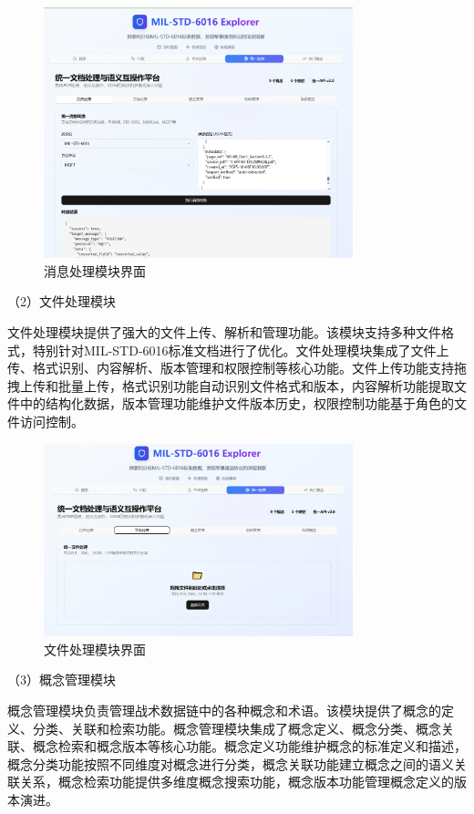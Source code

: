 \begin{figure}[H]
\centering
\includegraphics[width=0.8\textwidth]{chapters/fig-0/front_trans.png}
\caption{消息处理模块界面}
\label{fig:frontend-message}
\end{figure}

（2）文件处理模块

文件处理模块提供了强大的文件上传、解析和管理功能。该模块支持多种文件格式，特别针对MIL-STD-6016标准文档进行了优化。文件处理模块集成了文件上传、格式识别、内容解析、版本管理和权限控制等核心功能。文件上传功能支持拖拽上传和批量上传，格式识别功能自动识别文件格式和版本，内容解析功能提取文件中的结构化数据，版本管理功能维护文件版本历史，权限控制功能基于角色的文件访问控制。

\begin{figure}[H]
\centering
\includegraphics[width=0.8\textwidth]{chapters/fig-0/front_fileup.png}
\caption{文件处理模块界面}
\label{fig:frontend-file}
\end{figure}

（3）概念管理模块

概念管理模块负责管理战术数据链中的各种概念和术语。该模块提供了概念的定义、分类、关联和检索功能。概念管理模块集成了概念定义、概念分类、概念关联、概念检索和概念版本等核心功能。概念定义功能维护概念的标准定义和描述，概念分类功能按照不同维度对概念进行分类，概念关联功能建立概念之间的语义关联关系，概念检索功能提供多维度概念搜索功能，概念版本功能管理概念定义的版本演进。

